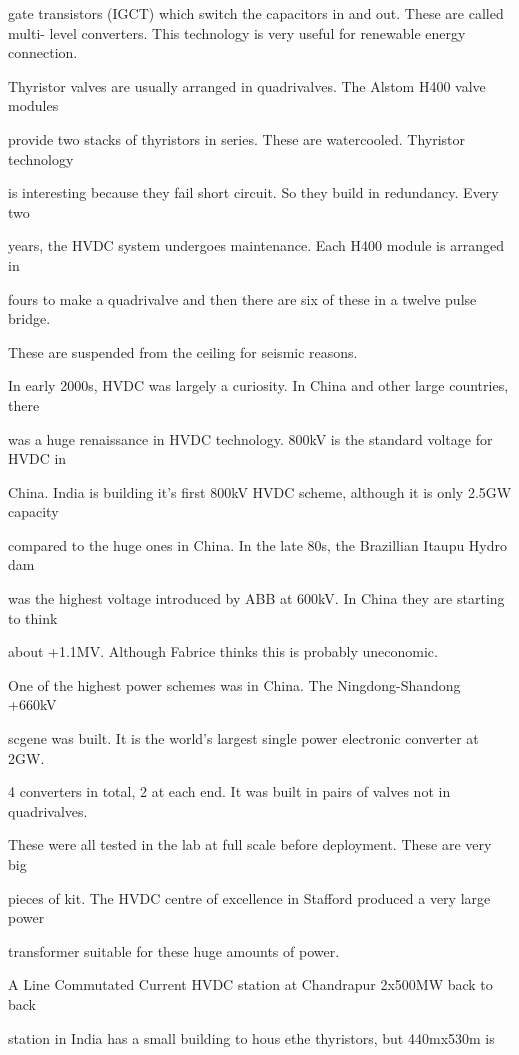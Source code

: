 gate transistors (IGCT) which switch the capacitors in and out. These are called multi-
level converters. This technology is very useful for renewable energy connection.

Thyristor valves are usually arranged in quadrivalves. The Alstom H400 valve modules 

provide two stacks of thyristors in series. These are watercooled. Thyristor technology 

is interesting because they fail short circuit. So they build in redundancy. Every two 

years, the HVDC system undergoes maintenance. Each H400 module is arranged in 

fours to make a quadrivalve and then there are six of these in a twelve pulse bridge. 

These are suspended from the ceiling for seismic reasons.

In early 2000s, HVDC was largely a curiosity. In China and other large countries, there 

was a huge renaissance in HVDC technology. 800kV is the standard voltage for HVDC in 

China. India is building it's first 800kV HVDC scheme, although it is only 2.5GW capacity 

compared to the huge ones in China. In the late 80s, the Brazillian Itaupu Hydro dam 

was the highest voltage introduced by ABB at 600kV. In China they are starting to think 

about +\-1.1MV. Although Fabrice thinks this is probably uneconomic.

One of the highest power schemes was in China. The Ningdong-Shandong +\-660kV 

scgene was built. It is the world's largest single power electronic converter at 2GW. 

4 converters in total, 2 at each end. It was built in pairs of valves not in quadrivalves. 

These were all tested in the lab at full scale before deployment. These are very big 

pieces of kit. The HVDC centre of excellence in Stafford produced a very large power 

transformer suitable for these huge amounts of power.

A Line Commutated Current HVDC station at Chandrapur 2x500MW back to back 

station in India has a small building to hous ethe thyristors, but 440mx530m is 

